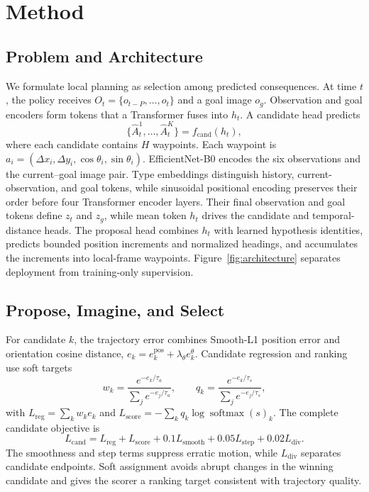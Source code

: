 \documentclass[conference]{IEEEtran}
\begin{document}
\section{Method}

\subsection{Problem and Architecture}

We formulate local planning as selection among predicted consequences. At time $t$, the policy receives $O_t=\{o_{t-P},\ldots,o_t\}$ and a goal image $o_g$. Observation and goal encoders form tokens that a Transformer fuses into $h_t$. A candidate head predicts
\begin{equation}
\{\hat A_t^1,\ldots,\hat A_t^K\}=f_{\mathrm{cand}}(h_t),
\end{equation}
where each candidate contains $H$ waypoints. Each waypoint is $a_i=(\Delta x_i,\Delta y_i,\cos\theta_i,\sin\theta_i)$. EfficientNet-B0 encodes the six observations and the current--goal image pair. Type embeddings distinguish history, current-observation, and goal tokens, while sinusoidal positional encoding preserves their order before four Transformer encoder layers. Their final observation and goal tokens define $z_t$ and $z_g$, while mean token $h_t$ drives the candidate and temporal-distance heads. The proposal head combines $h_t$ with learned hypothesis identities, predicts bounded position increments and normalized headings, and accumulates the increments into local-frame waypoints. Figure~\ref{fig:architecture} separates deployment from training-only supervision.


\subsection{Propose, Imagine, and Select}

For candidate $k$, the trajectory error combines Smooth-L1 position error and orientation cosine distance, $e_k=e_k^{\mathrm{pos}}+\lambda_\theta e_k^\theta$. Candidate regression and ranking use soft targets
\begin{equation}
w_k=\frac{e^{-e_k/\tau_a}}{\sum_j e^{-e_j/\tau_a}},\qquad
q_k=\frac{e^{-e_k/\tau_s}}{\sum_j e^{-e_j/\tau_s}},
\end{equation}
with $L_{\mathrm{reg}}=\sum_k w_ke_k$ and $L_{\mathrm{score}}=-\sum_kq_k\log\operatorname{softmax}(s)_k$. The complete candidate objective is
\begin{equation}
L_{\mathrm{cand}}=L_{\mathrm{reg}}+L_{\mathrm{score}}+0.1L_{\mathrm{smooth}}+0.05L_{\mathrm{step}}+0.02L_{\mathrm{div}}.
\end{equation}
The smoothness and step terms suppress erratic motion, while $L_{\mathrm{div}}$ separates candidate endpoints. Soft assignment avoids abrupt changes in the winning candidate and gives the scorer a ranking target consistent with trajectory quality.
\end{document}
